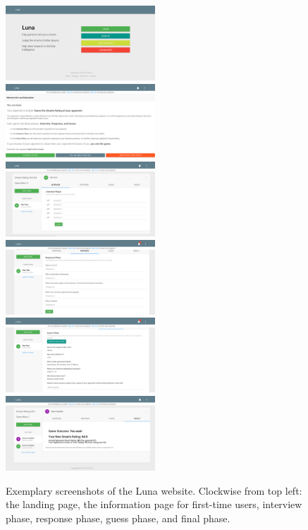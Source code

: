 \begin{figure}
\includegraphics[width=0.5\textwidth]{figures/screen1.png}
\includegraphics[width=0.5\textwidth]{figures/screen2.png}
\includegraphics[width=0.5\textwidth]{figures/screen3.png}
\includegraphics[width=0.5\textwidth]{figures/screen4.png}
\includegraphics[width=0.5\textwidth]{figures/screen5.png}
\includegraphics[width=0.5\textwidth]{figures/screen6.png}
\caption{Exemplary screenshots of the Luna website. Clockwise from top left: the landing page, the information page for first-time users, interview phase, response phase, guess phase, and final phase.}
\label{screenshotpic}
\end{figure}

